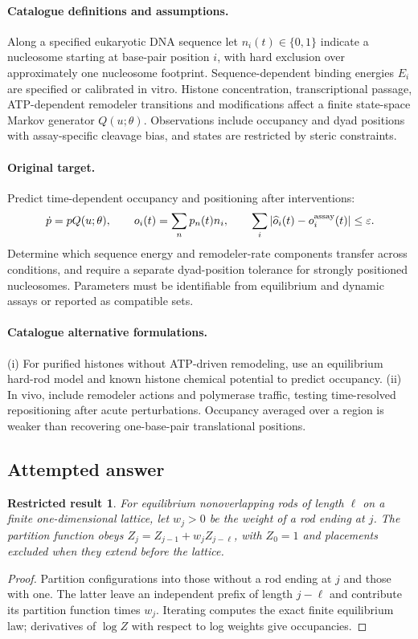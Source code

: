 \documentclass[11pt]{article}
\newtheorem{attemptresult}{Restricted result}[section]
\begin{document}
\paragraph{Catalogue definitions and assumptions.}
Along a specified eukaryotic DNA sequence let $n_i(t)\in\{0,1\}$ indicate a nucleosome starting at base-pair position $i$, with hard exclusion over approximately one nucleosome footprint. Sequence-dependent binding energies $E_i$ are specified or calibrated in vitro. Histone concentration, transcriptional passage, ATP-dependent remodeler transitions and modifications affect a finite state-space Markov generator $Q(u;\theta)$. Observations include occupancy and dyad positions with assay-specific cleavage bias, and states are restricted by steric constraints.
\paragraph{Original target.}
Predict time-dependent occupancy and positioning after interventions:
\[\dot p=pQ(u;\theta),\qquad o_i(t)=\sum_{n}p_n(t)n_i,\qquad \sum_i|\widehat o_i(t)-o_i^{\rm assay}(t)|\le\varepsilon.\]
Determine which sequence energy and remodeler-rate components transfer across conditions, and require a separate dyad-position tolerance for strongly positioned nucleosomes. Parameters must be identifiable from equilibrium and dynamic assays or reported as compatible sets.
\paragraph{Catalogue alternative formulations.}
(i) For purified histones without ATP-driven remodeling, use an equilibrium hard-rod model and known histone chemical potential to predict occupancy. (ii) In vivo, include remodeler actions and polymerase traffic, testing time-resolved repositioning after acute perturbations. Occupancy averaged over a region is weaker than recovering one-base-pair translational positions.
\subsection{Attempted answer}
\begin{attemptresult}
For equilibrium nonoverlapping rods of length $\ell$ on a finite one-dimensional lattice, let $w_j>0$ be the weight of a rod ending at $j$. The partition function obeys $Z_j=Z_{j-1}+w_jZ_{j-\ell}$, with $Z_0=1$ and placements excluded when they extend before the lattice.
\end{attemptresult}
\begin{proof}
Partition configurations into those without a rod ending at $j$ and those with one. The latter leave an independent prefix of length $j-\ell$ and contribute its partition function times $w_j$. Iterating computes the exact finite equilibrium law; derivatives of $\log Z$ with respect to log weights give occupancies.
\end{proof}
\end{document}
